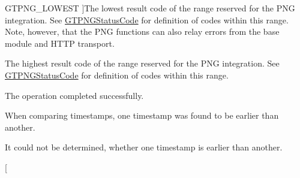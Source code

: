 \begin{Desc}
\begin{description}
{\hypertarget{group__common_gga43b0c0f44bcf02caf0c2866b1f647a35aa6c867b2e8a5c68beb3200d2f71b5c14}{
GTPNG\_\-LOWEST}
\label{group__common_gga43b0c0f44bcf02caf0c2866b1f647a35aa6c867b2e8a5c68beb3200d2f71b5c14}
}]The lowest result code of the range reserved for the PNG integration. See \hyperlink{group__png_ga70021c722b39d6b5945e9dd65b5d3b77}{GTPNGStatusCode} for definition of codes within this range. Note, however, that the PNG functions can also relay errors from the base module and HTTP transport. \item[{\em 
\hypertarget{group__common_gga43b0c0f44bcf02caf0c2866b1f647a35af97a98f04945f529eb41bb2194dc14ca}{
GTPNG\_\-HIGHEST}
\label{group__common_gga43b0c0f44bcf02caf0c2866b1f647a35af97a98f04945f529eb41bb2194dc14ca}
}]The highest result code of the range reserved for the PNG integration. See \hyperlink{group__png_ga70021c722b39d6b5945e9dd65b5d3b77}{GTPNGStatusCode} for definition of codes within this range. \item[{\em 
\hypertarget{group__common_gga43b0c0f44bcf02caf0c2866b1f647a35a996c7fc00d2a9bf08b5ba39bb9d58be9}{
GT\_\-OK}
\label{group__common_gga43b0c0f44bcf02caf0c2866b1f647a35a996c7fc00d2a9bf08b5ba39bb9d58be9}
}]The operation completed successfully. \item[{\em 
\hypertarget{group__common_gga43b0c0f44bcf02caf0c2866b1f647a35a5cbd9721ecf4a6ba9bb59bbe25b1c8f2}{
GT\_\-EARLIER}
\label{group__common_gga43b0c0f44bcf02caf0c2866b1f647a35a5cbd9721ecf4a6ba9bb59bbe25b1c8f2}
}]When comparing timestamps, one timestamp was found to be earlier than another. \item[{\em 
\hypertarget{group__common_gga43b0c0f44bcf02caf0c2866b1f647a35aa3219ad05a105f80de2f5c6611ba5304}{
GT\_\-NOT\_\-EARLIER}
\label{group__common_gga43b0c0f44bcf02caf0c2866b1f647a35aa3219ad05a105f80de2f5c6611ba5304}
}]It could not be determined, whether one timestamp is earlier than another. \item[{\em 
\hypertarget{group__common_gga43b0c0f44bcf02caf0c2866b1f647a35a264552b4501a19232e314f9918d286b0}{
}}
\end{description}
\end{Desc}
